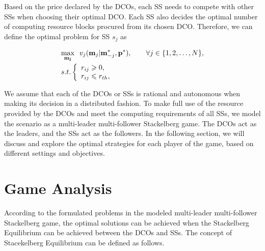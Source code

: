 \documentclass[twocolumn,10pt]{IEEEtran}
\begin{document}
Based on the price declared by the DCOs, each SS needs to compete with other SSs when choosing their optimal DCO. Each SS also decides the optimal number of computing resource blocks procured from its chosen DCO. Therefore, we can define the optimal problem for SS $s_j$ as

\begin{equation}
    \begin{array}{l}
     \begin{gathered}
 \mathop {\max }\limits_{\mathbf{m_{j}}} \;{\kern 1pt} \,v_{j} ( \mathbf{m}_j|  \mathbf{m}_{-j}^*, \mathbf{p}^*), \qquad \forall j \in \{1,2,\ldots,N\},\hfill \\
  s.t. \left\{ {\begin{array}{*{20}{l}}
  {{r_{ij}} \geqslant 0}, \\
  {{r_{ij}} \leqslant r_{th}},
\end{array}} \right. \hfill
\end{gathered}
    \end{array}
\end{equation}



We assume that each of the DCOs or SSs is rational and autonomous when making its decision in a distributed fashion. To make full use of the resource provided by the DCOs and meet the computing requirements of all SSs, we model the scenario as a multi-leader multi-follower Stackelberg game. The DCOs act as the leaders, and the SSs act as the followers. In the following section, we will discuss and explore the optimal strategies for each player of the game, based on different settings and objectives.
	

\section{Game Analysis}\label{sec:game analysis}

According to the formulated problems in the modeled multi-leader multi-follower Stackelberg game, the optimal solutions can be achieved when the Stackelberg Equilibrium can be achieved between the DCOs and SSs. The concept of Stacekelberg Equilibrium can be defined as follows.
\end{document}
